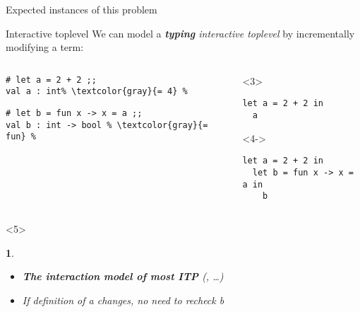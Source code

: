 \documentclass{beamer}
\theoremstyle{example}
\newtheorem{remarks}[theorem]{\translate{Remarks}}
\begin{document}
\begin{frame}[fragile]{Expected instances of this problem}
  \begin{block}{Interactive toplevel}
    We can model a \emph{\textbf{typing} interactive toplevel} by
    incrementally modifying a term:
    \begin{overlayarea}{\textwidth}{10em}
    \begin{columns}
      \begin{column}{0.47\textwidth}
        \begin{lstlisting}[escapechar=\%]
# let a = 2 + 2 ;;
val a : int% \textcolor{gray}{= 4} %
        \end{lstlisting}
\pause
        \begin{lstlisting}[escapechar=\%]
# let b = fun x -> x = a ;;
val b : int -> bool % \textcolor{gray}{= fun} %
        \end{lstlisting}
      \end{column}
      \begin{column}{.1mm}
        \rule{.1mm}{3cm}
      \end{column}
      \begin{column}{0.44\textwidth}
        \begin{onlyenv}<3>
          \begin{lstlisting}
let a = 2 + 2 in
  a
          \end{lstlisting}
          \vspace{1.2em}
        \end{onlyenv}
        \begin{onlyenv}<4->
          \begin{lstlisting}
let a = 2 + 2 in
  let b = fun x -> x = a in
    b
          \end{lstlisting}
        \end{onlyenv}
      \end{column}
    \end{columns}
    \end{overlayarea}
    \begin{visibleenv}<5>
      \begin{remarks}
        \begin{itemize}
        \item {\bf The interaction model of most ITP} (,
          \ldots)
        \item If definition of \textsf{a} changes, no need to recheck \textsf{b}
        \end{itemize}
      \end{remarks}
    \end{visibleenv}
  \end{block}
\end{frame}
\end{document}
